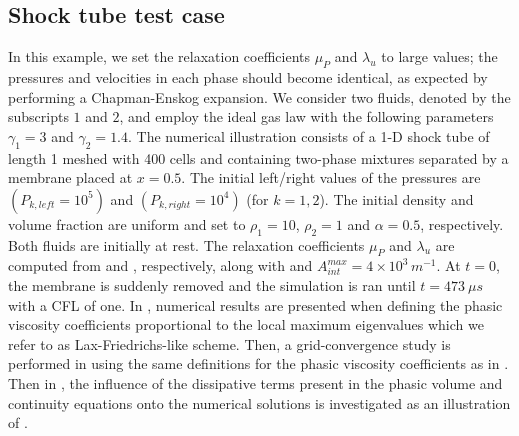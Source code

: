 \subsection{Shock tube test case}\label{sec:first-test}
%
In this example, we set the relaxation coefficients $\mu_P$ and $\lambda_u$ to large values; the pressures and velocities in each phase should become identical, as expected by performing a Chapman-Enskog expansion.
We consider two fluids, denoted by the subscripts $1$ and $2$, and employ the ideal gas law with the following parameters $\gamma_1=3$ and $\gamma_2=1.4$. 
The numerical illustration consists of a 1-D shock tube of length 1 meshed with 400 cells and containing two-phase mixtures separated by a membrane placed at $x=0.5$. 
The initial left/right values of the pressures are
 $(P_{k,left}=10^5)$ and $(P_{k,right}=10^4)$ (for $k=1,2$). The initial density and volume fraction are uniform and set to $\rho_1=10$, $\rho_2=1$ and $\alpha = 0.5$, respectively. 
Both fluids are initially at rest. The relaxation coefficients $\mu_P$ and $\lambda_u$ are computed from  and , respectively, 
along with  and $A_{int}^{max}=4 \times 10^3\,m^{-1}$. At $t=0$, the membrane is suddenly removed and the simulation is ran until $t=473 \ \mu s$ with a CFL of one. 
In , numerical results are presented when defining the phasic viscosity coefficients proportional to the local maximum eigenvalues which we refer to as Lax-Friedrichs-like scheme. 
Then, a grid-convergence study is performed in  using the same definitions for the phasic viscosity coefficients as in . Then in , the influence of the dissipative terms present in the phasic volume and continuity equations onto the numerical solutions is investigated as an illustration of . %
%
